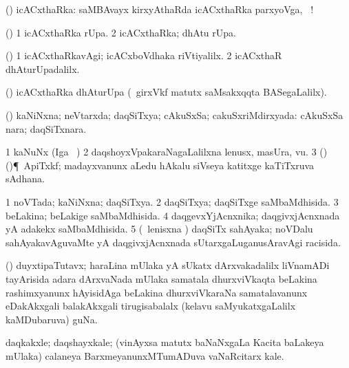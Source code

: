 \bentry
{}
\gl{\gu}
\bmng
(\vAyx) icACxthaRka:  saMBAvayx kirxyAthaRda icACxthaRka parxyoVga, \udA\ ! 
\emng
\eentry

\bentry
{}
\gl{\nA}
\bmng
(\vAyx) 
\bnum
\num{1} icACxthaRka rUpa. 
\num{2} icACxthaRka; dhAtu rUpa. 
\enum
\emng
\eentry

\bentry
{}
\gl{\kirxvi}
\bmng
(\vAyx) 
\bnum
\num{1} icACxthaRkavAgi; icACxboVdhaka riVtiyalilx. 
\num{2} icACxthaR dhAturUpadalilx. 
\enum
\emng
\eentry

\bentry
{}
\gl{\nA}
\bmng
(\vAyx) icACxthaRka dhAturUpa (\kanmu\ girxVkf matutx saMsakxqqta BASegaLalilx). 
\emng
\eentry

\bentry
{}
\gl{\gu}
\bmng
(\aMrashA) kaNiNxna; neVtarxda; daqSiTxya; cAkuSxSa; cakuSxriMdirxyada:  cAkuSxSa nara; daqSiTxnara. 
\emng
\eentry

\bentry
{}
\gl{\nA}
\bmng
\bnum
\num{1} kaNuNx (Iga \sA\ \hA) 
\num{2} daqshoyxVpakaraNagaLalilxna lenusx, masUra, \mo vu. 
\num{3} (\birx) ()\P\ ApiTxkf; madayxvanunx aLedu hAkalu siVseya katitxge kaTiTxruva sAdhana. 
\enum
\emng
\eentry

\bentry
{}
\gl{\gu}
\bmng
\bnum
\num{1} noVTada; kaNiNxna; daqSiTxya. 
\num{2} daqSiTxya; daqSiTxge saMbaMdhisida. 
\num{3} beLakina; beLakige saMbaMdhisida. 
\num{4} daqgevxYjAcnxnika; daqgivxjAcnxnada yA adakekx saMbaMdhisida. 
\num{5} (\kanmu\ lenisxna \vi) daqSiTx sahAyaka; noVDalu sahAyakavAguvaMte yA daqgivxjAcnxnada sUtarxgaLuganusAravAgi racisida. 
\enum
\emng
\eentry

\bentry
{}
\gl{\nA}
\bmng
(\ravi) duyxtipaTutavx; haraLina mUlaka yA sUkatx dArxvakadalilx liVnamADi tayArisida adara dArxvaNada mUlaka samatala dhurxviVkaqta beLakina rashimxyanunx hAyisidAga beLakina dhurxviVkaraNa samatalavanunx eDakAkxgali balakAkxgali tirugisabalalx (kelavu saMyukatxgaLalilx kaMDubaruva) guNa. 
\emng
\eentry

\bentry
{}
\gl{\nA}
\bmng
daqkakxle; daqshayxkale; (vinAyxsa matutx baNaNxgaLa Kacita baLakeya mUlaka) calaneya BarxmeyanunxMTumADuva vaNaRcitarx kale. 
\emng
\eentry

